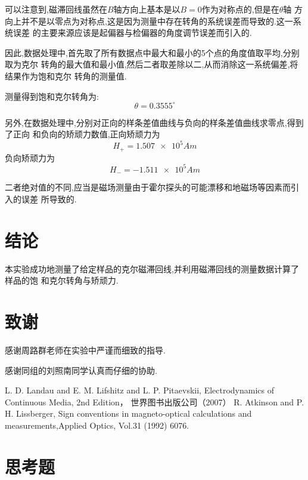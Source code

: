 \documentclass[aps,pre,12pt,preprint,onecolumn,showpacs,showkeys]{revtex4-1}
\begin{document}
可以注意到,磁滞回线虽然在$B$轴方向上基本是以$B = 0$作为对称点的,但是在$\theta$轴
方向上并不是以零点为对称点,这是因为测量中存在转角的系统误差而导致的.这一系统误差
的主要来源应该是起偏器与检偏器的角度调节误差而引入的.

因此,数据处理中,首先取了所有数据点中最大和最小的5个点的角度值取平均,分别取为克尔
转角的最大值和最小值,然后二者取差除以二,从而消除这一系统偏差,将结果作为饱和克尔
转角的测量值.

测量得到饱和克尔转角为:
\begin{equation}
    \theta = \num{0.3555}^{\circ}
\end{equation}

另外,在数据处理中,分别对正向的样条差值曲线与负向的样条差值曲线求零点,得到了正向
和负向的矫顽力数值,正向矫顽力为
\begin{equation}
    H_+ = \num{1.507e5}{Am}
\end{equation}
负向矫顽力为
\begin{equation}
    H_- = \num{-1.511e5}{Am}
\end{equation}

二者绝对值的不同,应当是磁场测量由于霍尔探头的可能漂移和地磁场等因素而引入的误差
所导致的.

\section{结论}

本实验成功地测量了给定样品的克尔磁滞回线,并利用磁滞回线的测量数据计算了样品的饱
和克尔转角与矫顽力.


\section{致谢}
感谢周路群老师在实验中严谨而细致的指导.

感谢同组的刘照南同学认真而仔细的协助.

\begin{thebibliography}{}
 L. D. Landau and E. M. Lifshitz and L. P. Pitaevskii,
Electrodynamics of Continuous Media, 2nd Edition， 世界图书出版公司（2007）
 R. Atkinson and P. H. Lissberger, Sign conventions in
magneto-optical calculations and measurements,Applied Optics, Vol.31 (1992)
6076.
\end{thebibliography}

\clearpage
\appendix
\section{思考题}
\end{document}
